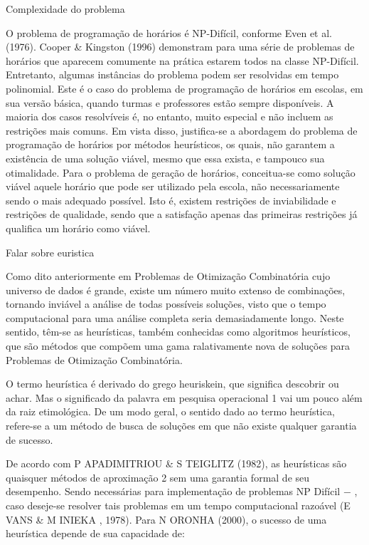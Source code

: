 \documentclass{abntpuc}
\begin{document}
Complexidade do problema

O problema de programação de horários é NP-Difícil, conforme Even et al. (1976).
Cooper & Kingston (1996) demonstram para uma série de problemas de horários
que aparecem comumente na prática estarem todos na classe NP-Difícil. Entretanto,
algumas instâncias do problema podem ser resolvidas em tempo polinomial. Este é o caso
do problema de programação de horários em escolas, em sua versão básica, quando turmas
e professores estão sempre disponíveis. A maioria dos casos resolvíveis é, no entanto,
muito especial e não incluem as restrições mais comuns.
Em vista disso, justifica-se a abordagem do problema de programação de horários
por métodos heurísticos, os quais, não garantem a existência de uma solução viável,
mesmo que essa exista, e tampouco sua otimalidade. Para o problema de geração de
horários, conceitua-se como solução viável aquele horário que pode ser utilizado pela
escola, não necessariamente sendo o mais adequado possível. Isto é, existem restrições de
inviabilidade e restrições de qualidade, sendo que a satisfação apenas das primeiras
restrições já qualifica um horário como viável.



	Falar sobre euristica

	Como dito anteriormente em Problemas de Otimização Combinatória cujo universo
de dados é grande, existe um número muito extenso de combinações, tornando inviável a
análise de todas possíveis soluções, visto que o tempo computacional para uma análise
completa seria demasiadamente longo. Neste sentido, têm-se as heurísticas, também
conhecidas como algoritmos heurísticos, que são métodos que compõem uma gama
ralativamente nova de soluções para Problemas de Otimização Combinatória.\par
O termo heurística é derivado do grego heuriskein, que significa descobrir ou achar.
Mas o significado da palavra em pesquisa operacional
1 vai um pouco além da raiz
etimológica. De um modo geral, o sentido dado ao termo heurística, refere-se a um método
de busca de soluções em que não existe qualquer garantia de sucesso.\par
De acordo com P APADIMITRIOU  & S TEIGLITZ (1982), as heurísticas são quaisquer
métodos de aproximação 2 sem uma garantia formal de seu desempenho. Sendo
necessárias para implementação de problemas NP Difícil − , caso deseje-se resolver tais
problemas em um tempo computacional razoável (E VANS  & M INIEKA , 1978).
Para N ORONHA (2000), o sucesso de uma heurística depende de sua capacidade de:	\cite{glover}
\end{document}
